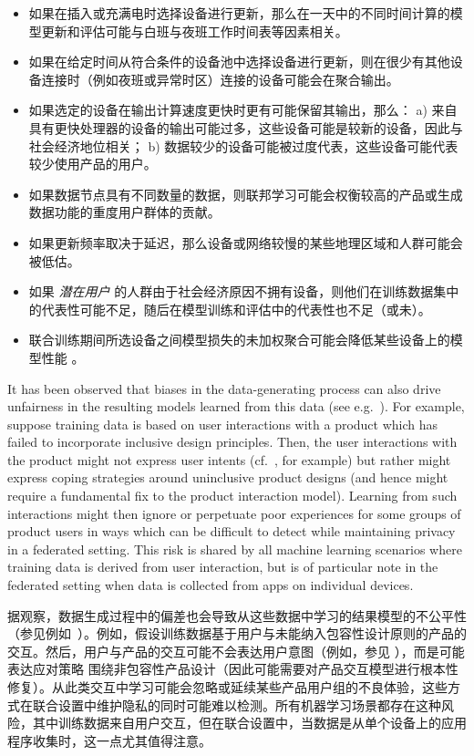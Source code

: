 \begin{itemize}
    \item 如果在插入或充满电时选择设备进行更新，那么在一天中的不同时间计算的模型更新和评估可能与白班与夜班工作时间表等因素相关。
    \item 如果在给定时间从符合条件的设备池中选择设备进行更新，则在很少有其他设备连接时（例如夜班或异常时区）连接的​​设备可能会在聚合输出。
    \item 如果选定的设备在输出计算速度更快时更有可能保留其输出，那么： a) 来自具有更快处理器的设备的输出可能过多，这些设备可能是较新的设备，因此与社会经济地位相关； b) 数据较少的设备可能被过度代表，这些设备可能代表较少使用产品的用户。
    \item 如果数据节点具有不同数量的数据，则联邦学习可能会权衡较高的产品或生成数据功能的重度用户群体的贡献。
    \item 如果更新频率取决于延迟，那么设备或网络较慢的某些地理区域和人群可能会被低估。
    \item 如果 {\em 潜在用户} 的人群由于社会经济原因不拥有设备，则他们在训练数据集中的代表性可能不足，随后在模型训练和评估中的代表性也不足（或未）。
    \item 联合训练期间所选设备之间模型损失的未加权聚合可能会降低某些设备上的模型性能 \cite{li2019fair}。
\end{itemize}


It has been observed that biases in the data-generating process can also drive unfairness in the resulting models learned from this data (see e.g.\ \cite{eckhouse2019layers, richardson2019dirty}). For example, suppose training data is based on user interactions with a product which has failed to incorporate inclusive design principles. Then, the user interactions with the product might not express user intents (cf.\ \cite{sambasivan2018privacy}, for example) but rather might express coping strategies
around uninclusive product designs (and hence might require a fundamental fix to the product interaction model). Learning from such interactions might then ignore or perpetuate poor experiences for some groups of product users in ways which can be difficult to detect while maintaining privacy in a federated setting. This risk is shared by all machine learning scenarios where training data is derived from user interaction, but is of particular note in the federated setting when data is collected from apps on individual devices. 

据观察，数据生成过程中的偏差也会导致从这些数据中学习的结果模型的不公平性（参见例如\ \cite{eckhouse2019layers, richardson2019dirty}）。例如，假设训练数据基于用户与未能纳入包容性设计原则的产品的交互。然后，用户与产品的交互可能不会表达用户意图（例如，参见 \cite{sambasivan2018privacy}），而是可能表达应对策略
围绕非包容性产品设计（因此可能需要对产品交互模型进行根本性修复）。从此类交互中学习可能会忽略或延续某些产品用户组的不良体验，这些方式在联合设置中维护隐私的同时可能难以检测。所有机器学习场景都存在这种风险，其中训练数据来自用户交互，但在联合设置中，当数据是从单个设备上的应用程序收集时，这一点尤其值得注意。

